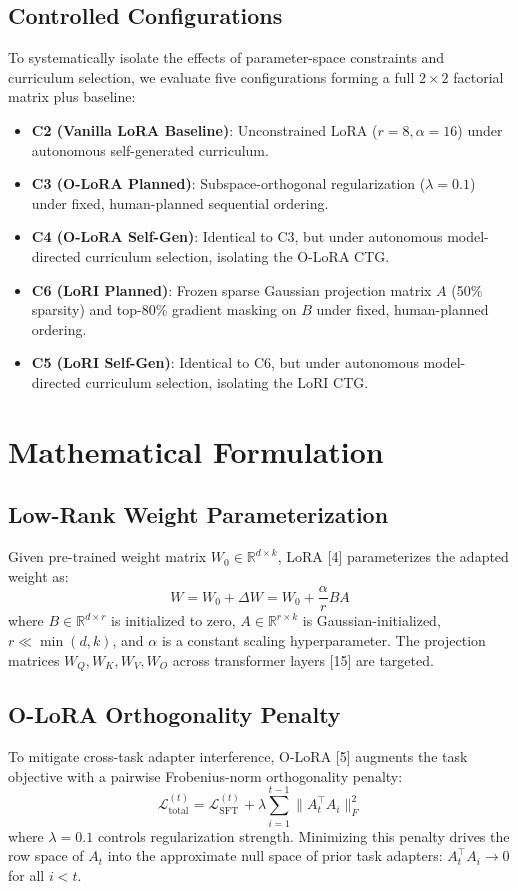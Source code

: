 \documentclass[10pt,journal,compsoc]{IEEEtran}
\begin{document}
\subsection{Controlled Configurations}
To systematically isolate the effects of parameter-space constraints and curriculum selection, we evaluate five configurations forming a full $2 \times 2$ factorial matrix plus baseline:
\begin{itemize}
    \item \textbf{C2 (Vanilla LoRA Baseline)}: Unconstrained LoRA ($r=8, \alpha=16$) under autonomous self-generated curriculum.
    \item \textbf{C3 (O-LoRA Planned)}: Subspace-orthogonal regularization ($\lambda=0.1$) under fixed, human-planned sequential ordering.
    \item \textbf{C4 (O-LoRA Self-Gen)}: Identical to C3, but under autonomous model-directed curriculum selection, isolating the O-LoRA CTG.
    \item \textbf{C6 (LoRI Planned)}: Frozen sparse Gaussian projection matrix $A$ (50\% sparsity) and top-80\% gradient masking on $B$ under fixed, human-planned ordering.
    \item \textbf{C5 (LoRI Self-Gen)}: Identical to C6, but under autonomous model-directed curriculum selection, isolating the LoRI CTG.
\end{itemize}

\section{Mathematical Formulation}

\subsection{Low-Rank Weight Parameterization}
Given pre-trained weight matrix $W_0 \in \mathbb{R}^{d \times k}$, LoRA [4] parameterizes the adapted weight as:
\begin{equation}
W = W_0 + \Delta W = W_0 + \frac{\alpha}{r} B A
\end{equation}
where $B \in \mathbb{R}^{d \times r}$ is initialized to zero, $A \in \mathbb{R}^{r \times k}$ is Gaussian-initialized, $r \ll \min(d,k)$, and $\alpha$ is a constant scaling hyperparameter. The projection matrices $W_Q, W_K, W_V, W_O$ across transformer layers [15] are targeted.

\subsection{O-LoRA Orthogonality Penalty}
To mitigate cross-task adapter interference, O-LoRA [5] augments the task objective with a pairwise Frobenius-norm orthogonality penalty:
\begin{equation}
\mathcal{L}_{\text{total}}^{(t)} = \mathcal{L}_{\text{SFT}}^{(t)} + \lambda \sum_{i=1}^{t-1} \|A_t^\top A_i\|_F^2
\end{equation}
where $\lambda = 0.1$ controls regularization strength. Minimizing this penalty drives the row space of $A_t$ into the approximate null space of prior task adapters: $A_t^\top A_i \to 0$ for all $i < t$.
\end{document}
